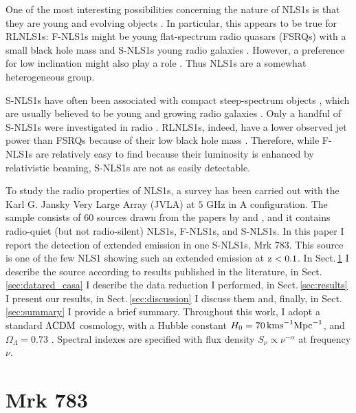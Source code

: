 \documentclass[../main.tex]{subfiles}
\begin{document}
One of the most interesting possibilities concerning the nature of NLS1s is that they are young and evolving objects \citep{Mathur00}.
In particular, this appears to be true for RLNLS1s: F-NLS1s might be young flat-spectrum radio quasars (FSRQs) with a small black hole mass and S-NLS1s young radio galaxies \citep{Foschini15, Berton16c}.
However, a preference for low inclination might also play a role \citep[e.g.,][]{Shen14,Peterson11}.
Thus NLS1s are a somewhat heterogeneous group.

S-NLS1s have often been associated with compact steep-spectrum objects \citep[CSS;][]{Oshlack01, Komossa06, Gallo06a, Yuan08, Caccianiga14, Gu15, Schulz16, Berton16c, Caccianiga17}, which are usually believed to be young and growing radio galaxies \citep{Fanti95}. 
Only a handful of S-NLS1s were investigated in radio \citep{Whalen06, Anton08, Doi12, Richards15, Doi15, Gu15, Caccianiga17}. 
RLNLS1s, indeed, have a lower observed jet power than FSRQs \citep{Foschini15} because of their low black hole mass \citep{Heinz03,Foschini14}.
Therefore, while F-NLS1s are relatively easy to find because their luminosity is enhanced by relativistic beaming, S-NLS1s are not as easily detectable.

To study the radio properties of NLS1s, a survey has been carried out with the Karl G. Jansky Very Large Array (JVLA) at $5$ GHz in A configuration.
The sample consists of 60 sources drawn from the papers by \citet{Foschini15} and \citet{Berton15a}, and it contains radio-quiet (but not radio-silent) NLS1s, F-NLS1s, and S-NLS1s.
In this paper I report the detection of extended emission in one S-NLS1s, Mrk 783. 
This source is one of the few NLS1 showing such an extended emission at $\rm z<0.1$.  
In Sect.\,\ref{sec:mrk783} I describe the source according to results published in the literature, in Sect.\,\ref{sec:datared_casa} I describe the data reduction I performed, in Sect.\,\ref{sec:results} I present our results, in Sect.\,\ref{sec:discussion} I discuss them and, finally, in Sect.\,\ref{sec:summary} I provide a brief summary. 
Throughout this work, I adopt a standard $\rm \Lambda CDM$ cosmology, with a Hubble constant $H_0 = 70\,\si{\kms Mpc^{-1}}$, and $\Omega_\Lambda = 0.73$ \citep{Komatsu11}.
Spectral indexes are specified with flux density $S_{\nu} \propto \nu^{-\alpha}$ at frequency $\nu$.


\section{Mrk 783}
\label{sec:mrk783}
\end{document}

